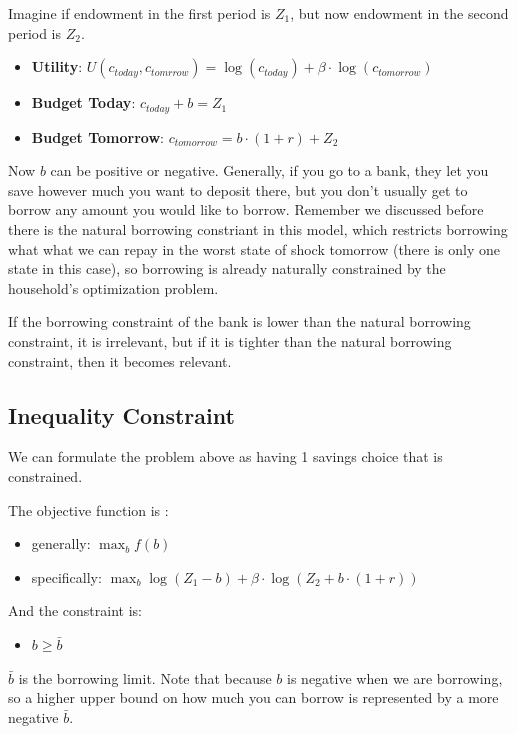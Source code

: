 \documentclass[
]{book}
\providecommand{\tightlist}{%
  \setlength{\itemsep}{0pt}\setlength{\parskip}{0pt}}
\begin{document}
Imagine if endowment in the first period is \(Z_1\), but now endowment in
the second period is \(Z_2\).

\begin{itemize}
\item
  \textbf{Utility}:
  \(U(c_{today} ,c_{tomrrow} )=\log (c_{today} )+\beta \cdot \log (c_{tomorrow} )\)
\item
  \textbf{Budget Today}: \(c_{today} +b=Z_1\)
\item
  \textbf{Budget Tomorrow}: \(c_{tomorrow} =b\cdot (1+r)+Z_2\)
\end{itemize}

Now \(b\) can be positive or negative. Generally, if you go to a bank,
they let you save however much you want to deposit there, but you don't
usually get to borrow any amount you would like to borrow. Remember we
discussed before there is the natural borrowing constriant in this
model, which restricts borrowing what what we can repay in the worst
state of shock tomorrow (there is only one state in this case), so
borrowing is already naturally constrained by the household's
optimization problem.

If the borrowing constraint of the bank is lower than the natural
borrowing constraint, it is irrelevant, but if it is tighter than the
natural borrowing constraint, then it becomes relevant.

\hypertarget{inequality-constraint}{%
\subsection{Inequality Constraint}\label{inequality-constraint}}

We can formulate the problem above as having 1 savings choice that is
constrained.

The objective function is :

\begin{itemize}
\item
  generally: \(\max_b f(b)\)
\item
  specifically:
  \(\max_b \log (Z_1 -b)+\beta \cdot \log (Z_2 +b\cdot (1+r))\)
\end{itemize}

And the constraint is:

\begin{itemize}
\tightlist
\item
  \(\displaystyle b\ge \bar{b}\)
\end{itemize}

\(\bar{b}\) is the borrowing limit. Note that because \(b\) is negative when
we are borrowing, so a higher upper bound on how much you can borrow is
represented by a more negative \(\bar{b}\).
\end{document}
